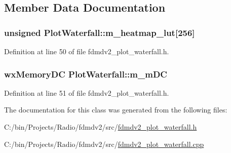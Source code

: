 \subsection{Member Data Documentation}
\hypertarget{class_plot_waterfall_aae04482318331ac760954376f23a1e3c}{
\subsubsection[{m\-\_\-heatmap\-\_\-lut}]{\setlength{\rightskip}{0pt plus 5cm}unsigned Plot\-Waterfall\-::m\-\_\-heatmap\-\_\-lut\mbox{[}256\mbox{]}\hspace{0.3cm}{\ttfamily [protected]}}}\label{class_plot_waterfall_aae04482318331ac760954376f23a1e3c}


Definition at line 50 of file fdmdv2\-\_\-plot\-\_\-waterfall.\-h.

\hypertarget{class_plot_waterfall_a1b80aa40a1194ece27c87ec265ef7d2c}{
\subsubsection[{m\-\_\-m\-D\-C}]{\setlength{\rightskip}{0pt plus 5cm}wx\-Memory\-D\-C Plot\-Waterfall\-::m\-\_\-m\-D\-C\hspace{0.3cm}{\ttfamily [protected]}}}\label{class_plot_waterfall_a1b80aa40a1194ece27c87ec265ef7d2c}


Definition at line 51 of file fdmdv2\-\_\-plot\-\_\-waterfall.\-h.



The documentation for this class was generated from the following files\-:\begin{DoxyCompactItemize}
\item 
C\-:/bin/\-Projects/\-Radio/fdmdv2/src/\hyperlink{fdmdv2__plot__waterfall_8h}{fdmdv2\-\_\-plot\-\_\-waterfall.\-h}\item 
C\-:/bin/\-Projects/\-Radio/fdmdv2/src/\hyperlink{fdmdv2__plot__waterfall_8cpp}{fdmdv2\-\_\-plot\-\_\-waterfall.\-cpp}\end{DoxyCompactItemize}
